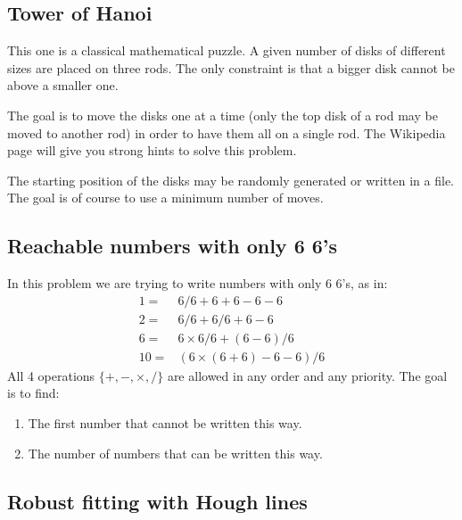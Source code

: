 \documentclass{ecnreport}
\begin{document}
 
\subsection{Tower of Hanoi}

This one is a classical mathematical puzzle.
A given number of disks of different sizes are placed on three rods.
The only constraint is that a bigger disk cannot be above a smaller one. 

The goal is to move the disks one at a time (only the top disk of a rod may be moved to another rod) in order to have them all on a single rod.
The Wikipedia page will give you strong hints to solve this problem.

The starting position of the disks may be randomly generated or written in a file. The goal is of course to use a minimum number of moves.

\begin{itemize}
 \end{itemize}
 
 \subsection{Reachable numbers with only 6 6's}
 
 In this problem we are trying to write numbers with only 6 6's, as in:
 \begin{eqnarray*}
  1 =& 6/6 + 6 +6-6-6 \\
  2 =& 6/6 + 6/6 + 6 - 6 \\
  6 =& 6\times 6/6 + (6-6)/6 \\
  10 =& (6\times(6+6) -6 -6)/6
 \end{eqnarray*}
 All 4 operations $\{+, -, \times, /\}$ are allowed in any order and any priority.
 The goal is to find:
 \begin{enumerate}
  \item The first number that cannot be written this way.
  \item The number of numbers that can be written this way.
 \end{enumerate}
\begin{itemize}
 \end{itemize}
 
 
 \subsection{Robust fitting with Hough lines}
 
\end{document}
